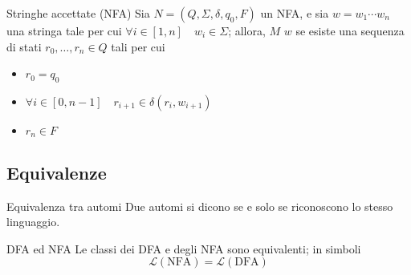 \documentclass[a4paper, 12pt]{report}
\begin{document}
    \begin{frameddefn}{Stringhe accettate (NFA)}
        Sia $N = (Q, \Sigma, \delta, q_0, F)$ un NFA, e sia $w = w_1\cdots w_n$ una stringa tale per cui $\forall i \in [1, n] \quad w_i \in \Sigma$; allora, $M$  $w$ se esiste una sequenza di stati $r_0, \ldots, r_n \in Q$ tali per cui

        \begin{itemize}
            \item $r_0 = q_0$
            \item $\forall i \in [0, n - 1] \quad r_{i + 1} \in \delta(r_i, w_{i + 1})$
            \item $r_n \in F$
        \end{itemize}
    \end{frameddefn}

    \subsection{Equivalenze}

    \begin{frameddefn}{Equivalenza tra automi}
        Due automi si dicono  se e solo se riconoscono lo stesso linguaggio.
    \end{frameddefn}

    \begin{framedthm}[label={nfa equiv}]{DFA ed NFA}
        Le classi dei DFA e degli NFA sono equivalenti; in simboli $$\mathcal{L}(\mathrm{NFA}) = \mathcal{L}(\mathrm{DFA})$$
    \end{framedthm}
\end{document}
